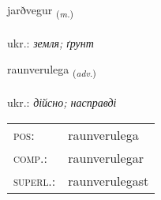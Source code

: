 \documentclass[frontgrid, backgrid]{flacards}\usepackage[]{graphicx}\usepackage[]{xcolor}
\begin{document}
\renewcommand{\blhead}{\vskip5pt {\small\bfseries\footnotesize Nafnorð | іменник }}
\renewcommand{\bcfoot}{\vskip5pt \hspace{2pt}{\small\bfseries\footnotesize 3K}}


{jarðvegur \small{\textsubscript{(\textit{m.})}} \\[1ex] %
\textphonetic{[jarðvɛɣʏr]} \\
ukr.: \emph{земля; ґрунт} \\  [2ex]
\renewcommand*{\arraystretch}{0.8}
}

\renewcommand{\flhead}{\vskip5pt \fboxsep=0pt {\small\bfseries\footnotesize Atviksorð | прислівник}}
\renewcommand{\fcfoot}{\vskip5pt \fboxsep=0pt \hspace{2pt}{\small\bfseries\footnotesize 3K}}

\renewcommand{\blhead}{\vskip5pt {\small\bfseries\footnotesize Atviksorð | прислівник }}
\renewcommand{\bcfoot}{\vskip5pt \hspace{2pt}{\small\bfseries\footnotesize 3K}}


{raunverulega \small{\textsubscript{(\textit{adv.})}} \\[1ex] %
\textphonetic{[rœinvɛrʏlɛɣa]} \\
ukr.: \emph{дійсно; насправді} \\  [2ex]
\renewcommand*{\arraystretch}{0.8}
\begin{tabular}{ll}
\textsc{pos}: & raunverulega \\ 
\textsc{comp.}: & raunverulegar \\ 
\textsc{superl.}: & raunverulegast \\
\end{tabular}
}
\end{document}
